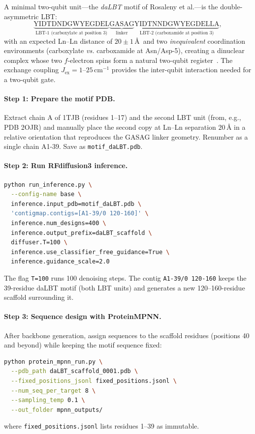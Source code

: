 \documentclass[11pt,oneside]{amsbook}
\numberwithin{equation}{section}
\theoremstyle{plain}
\theoremstyle{definition}
\theoremstyle{remark}
\begin{document}
A minimal two-qubit unit—the \emph{daLBT} motif of Rosaleny et al.---is the
double-asymmetric LBT:
\[
  \underbrace{\text{YIDTDNDGWYEGDEL}}_{\text{LBT-1 (carboxylate at position 3)}}
  \underbrace{\text{GASAG}}_{\text{linker}}
  \underbrace{\text{YIDTNNDGWYEGDELLA}}_{\text{LBT-2 (carboxamide at position 3)}},
\]
with an expected Ln--Ln distance of $20 \pm 1$\,\AA\ and two
\emph{inequivalent} coordination environments (carboxylate \emph{vs.}
carboxamide at Asn/Asp-5), creating a dinuclear complex whose two $f$-electron
spins form a natural two-qubit register~\cite{RosalenyEtAl2017}.  The exchange
coupling $J_{\text{ex}} = 1$--$25\,\text{cm}^{-1}$ provides the inter-qubit
interaction needed for a two-qubit gate.

\paragraph{Step 1: Prepare the motif PDB.}
Extract chain A of 1TJB (residues 1--17) and the second LBT unit (from, e.g.,
PDB 2OJR) and manually place the second copy at Ln--Ln separation $20\,\text{\AA}$
in a relative orientation that reproduces the GASAG linker geometry.  Renumber
as a single chain A1-39.  Save as \texttt{motif\_daLBT.pdb}.

\paragraph{Step 2: Run RFdiffusion3 inference.}
\begin{lstlisting}[language=bash,basicstyle=\small\ttfamily,
                   caption={RFdiffusion3 invocation for daLBT scaffolding},
                   label={lst:rfd3_invocation}]
python run_inference.py \
  --config-name base \
  inference.input_pdb=motif_daLBT.pdb \
  'contigmap.contigs=[A1-39/0 120-160]' \
  inference.num_designs=400 \
  inference.output_prefix=daLBT_scaffold \
  diffuser.T=100 \
  inference.use_classifier_free_guidance=True \
  inference.guidance_scale=2.0
\end{lstlisting}

The flag \texttt{T=100} runs 100 denoising steps.  The contig
\texttt{A1-39/0 120-160} keeps the 39-residue daLBT motif (both LBT units) and
generates a new 120--160-residue scaffold surrounding it.

\paragraph{Step 3: Sequence design with ProteinMPNN.}
After backbone generation, assign sequences to the scaffold residues (positions
40 and beyond) while keeping the motif sequence fixed:
\begin{lstlisting}[language=bash,basicstyle=\small\ttfamily,
                   caption={ProteinMPNN sequence design on daLBT scaffold},
                   label={lst:mpnn_design}]
python protein_mpnn_run.py \
  --pdb_path daLBT_scaffold_0001.pdb \
  --fixed_positions_jsonl fixed_positions.jsonl \
  --num_seq_per_target 8 \
  --sampling_temp 0.1 \
  --out_folder mpnn_outputs/
\end{lstlisting}
\noindent where \texttt{fixed\_positions.jsonl} lists residues 1--39 as
immutable.
\end{document}
